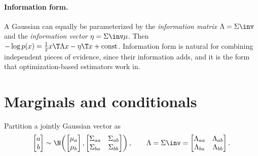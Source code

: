 \paragraph{Information form.} A Gaussian can equally be parameterized by the \emph{information
matrix} $\Lambda = \Sigma\inv$ and the \emph{information vector} $\eta = \Sigma\inv\mu$. Then
$-\log p(x) = \tfrac12 x\T\Lambda x - \eta\T x + \text{const}$. Information form is natural for
combining independent pieces of evidence, since their information adds, and it is the form that
optimization-based estimators work in.

\section{Marginals and conditionals}

Partition a jointly Gaussian vector as
\begin{equation}
  \begin{bmatrix} a \\ b \end{bmatrix} \sim
  \N\!\left( \begin{bmatrix} \mu_a \\ \mu_b \end{bmatrix},
  \begin{bmatrix} \Sigma_{aa} & \Sigma_{ab} \\ \Sigma_{ba} & \Sigma_{bb} \end{bmatrix} \right),
  \qquad
  \Lambda = \Sigma\inv = \begin{bmatrix} \Lambda_{aa} & \Lambda_{ab} \\ \Lambda_{ba} & \Lambda_{bb} \end{bmatrix}.
\end{equation}

